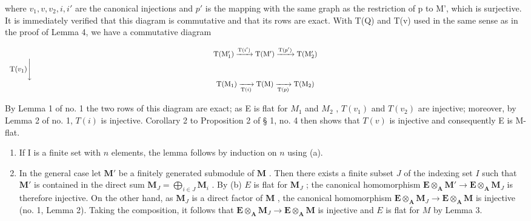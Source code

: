 where \(v_{1}, v, v_{2}, i, i'\) are the canonical injections and \(p'\) is the mapping with the same graph as the restriction of p to M', which is surjective. It is immediately verified that this diagram is commutative and that its rows are exact. With T(Q) and T(v) used in the same sense as in the proof of Lemma 4, we have a commutative diagram

\[
\begin{array}{c} \mathrm{T} (\mathrm{M} _ {1} ^ {\prime}) \xrightarrow {\mathrm{T} (i ^ {\prime})} \mathrm{T} (\mathrm{M} ^ {\prime}) \xrightarrow {\mathrm{T} (p ^ {\prime})} \mathrm{T} (\mathrm{M} _ {2} ^ {\prime}) \\ \mathrm{T} (v _ {1}) \Biggl \downarrow \qquad \qquad \qquad \qquad \qquad \qquad \qquad \qquad \qquad \qquad \qquad \qquad \qquad \qquad \qquad \qquad \qquad \qquad \qquad \qquad \qquad \qquad \qquad \qquad \qquad \qquad \qquad \qquad \qquad \qquad \qquad \qquad \qquad \qquad \\ \mathrm{T} (\mathrm{M} _ {1}) \xrightarrow [ \mathrm{T} (i) ]{} \mathrm{T} (\mathrm{M}) \xrightarrow [ \mathrm{T} (p) ]{} \mathrm{T} (\mathrm{M} _ {2}) \end{array}
\]

By Lemma 1 of no. 1 the two rows of this diagram are exact; as E is flat for \(M_{1}\) and \(M_{2}\) , \(T(v_{1})\) and \(T(v_{2})\) are injective; moreover, by Lemma 2 of no. 1, \(T(i)\) is injective. Corollary 2 to Proposition 2 of § 1, no. 4 then shows that \(T(v)\) is injective and consequently E is M-flat.

\begin{enumerate}
\def\labelenumi{(\alph{enumi})}
\setcounter{enumi}{1}
\item
  If I is a finite set with \(n\) elements, the lemma follows by induction on \(n\) using (a).
\item
  In the general case let \(\mathbf{M}'\) be a finitely generated submodule of \(\mathbf{M}\) . Then there exists a finite subset \(J\) of the indexing set \(I\) such that \(\mathbf{M}'\) is contained in the direct sum \(\mathbf{M}_J = \bigoplus_{i \in J} \mathbf{M}_i\) . By (b) \(E\) is flat for \(\mathbf{M}_J\) ; the canonical homomorphism \(\mathbf{E} \otimes_{\mathbf{A}} \mathbf{M}' \to \mathbf{E} \otimes_{\mathbf{A}} \mathbf{M}_J\) is therefore injective. On the other hand, as \(\mathbf{M}_J\) is a direct factor of \(\mathbf{M}\) , the canonical homomorphism \(\mathbf{E} \otimes_{\mathbf{A}} \mathbf{M}_J \to \mathbf{E} \otimes_{\mathbf{A}} \mathbf{M}\) is injective (no. 1, Lemma 2). Taking the composition, it follows that \(\mathbf{E} \otimes_{\mathbf{A}} \mathbf{M}_J \to \mathbf{E} \otimes_{\mathbf{A}} \mathbf{M}\) is injective and \(E\) is flat for \(M\) by Lemma 3.
\end{enumerate}

